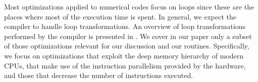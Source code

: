 
Most optimizations applied to numerical codes focus on loops since these are the
places where most of the execution time is spent. In general, we expect the
compiler to handle loop transformations. An overview of loop transformations
performed by the compiler is presented in \cite{bacon1994}. We cover in our
paper only a subset of those optimizations relevant for our discussion and our
routines. Specifically, we focus on optimizations that exploit the deep memory
hierarchy of modern CPUs, that make use of the instruction parallelism provided
by the hardware, and those that decrease the number of instructions executed.

